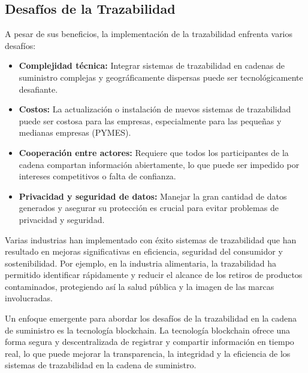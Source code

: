 \documentclass[main.tex]{subfiles}
\begin{document}
\subsection{Desafíos de la Trazabilidad}
A pesar de sus beneficios, la implementación de la trazabilidad enfrenta varios desafíos:
\begin{itemize}
    \item \textbf{Complejidad técnica:} Integrar sistemas de trazabilidad en cadenas de suministro complejas y geográficamente dispersas puede ser tecnológicamente desafiante.
    \item \textbf{Costos:} La actualización o instalación de nuevos sistemas de trazabilidad puede ser costosa para las empresas, especialmente para las pequeñas y medianas empresas (PYMES).
    \item \textbf{Cooperación entre actores:} Requiere que todos los participantes de la cadena compartan información abiertamente, lo que puede ser impedido por intereses competitivos o falta de confianza.
    \item \textbf{Privacidad y seguridad de datos:} Manejar la gran cantidad de datos generados y asegurar su protección es crucial para evitar problemas de privacidad y seguridad.
\end{itemize}

Varias industrias han implementado con éxito sistemas de trazabilidad que han resultado en mejoras significativas en eficiencia, seguridad del consumidor y sostenibilidad. Por ejemplo, en la industria alimentaria, la trazabilidad ha permitido identificar rápidamente y reducir el alcance de los retiros de productos contaminados, protegiendo así la salud pública y la imagen de las marcas involucradas.

Un enfoque emergente para abordar los desafíos de la trazabilidad en la cadena de suministro es la tecnología blockchain. La tecnología blockchain ofrece una forma segura y descentralizada de registrar y compartir información en tiempo real, lo que puede mejorar la transparencia, la integridad y la eficiencia de los sistemas de trazabilidad en la cadena de suministro.


\end{document}
